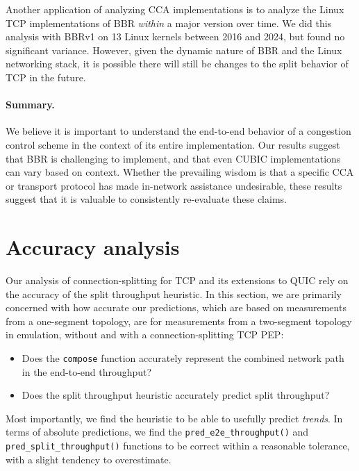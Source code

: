 Another application of analyzing CCA implementations is to analyze the Linux TCP
implementations of BBR \textit{within} a major version over time. We did
this analysis with BBRv1 on 13 Linux kernels between 2016 and 2024, but found
no significant variance. However, given the dynamic nature of BBR and the
Linux networking stack, it
is possible there will still be changes to the split behavior of TCP in the future.

\paragraph{Summary.}

We believe it is important to understand the end-to-end behavior of a congestion
control scheme in the context of its entire implementation.
Our results suggest that BBR is challenging to implement, and that even CUBIC
implementations can vary based on context. Whether the prevailing wisdom is
that a specific CCA or transport protocol has made in-network assistance
undesirable, these results suggest that it is valuable to consistently
re-evaluate these claims.

\section{Accuracy analysis}
\label{sec:splitting:accuracy}



Our analysis of connection-splitting for TCP and its extensions to QUIC rely on
the accuracy of the split throughput heuristic. In this section, we are
primarily concerned with how accurate our predictions, which are based on
measurements from a one-segment topology, are for measurements from a
two-segment topology in emulation, without and with a connection-splitting TCP
PEP:
\begin{itemize}[noitemsep]
\item Does the \texttt{compose} function accurately represent the combined
 network path in the end-to-end throughput?
\item Does the split throughput heuristic accurately predict split throughput?
\end{itemize}

\noindent Most importantly, we find the heuristic to be able to usefully
 predict \textit{trends}.
 In terms of absolute predictions, we find the \texttt{pred\_e2e\_throughput()}
 and \texttt{pred\_split\_throughput()} functions to be correct within a
 reasonable tolerance, with a slight tendency to overestimate.

